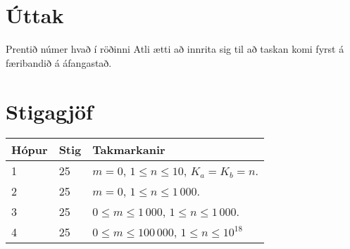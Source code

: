 \section*{Úttak}
Prentið númer hvað í röðinni Atli ætti að innrita sig til að taskan komi fyrst á færibandið á áfangastað.

\section*{Stigagjöf}
\begin{tabular}{|l|l|l|}
\hline
Hópur & Stig & Takmarkanir \\ \hline
1     & 25   & $m = 0$, $1 \leq n \leq 10$, $K_a = K_b = n$. \\ \hline
2     & 25   & $m = 0$, $1 \leq n \leq 1\,000$. \\ \hline
3     & 25   & $0 \leq m \leq 1\,000$, $1 \leq n \leq 1\,000$. \\ \hline
4     & 25   & $0 \leq m \leq 100\,000$, $1 \leq n \leq 10^{18}$ \\ \hline
\end{tabular}

